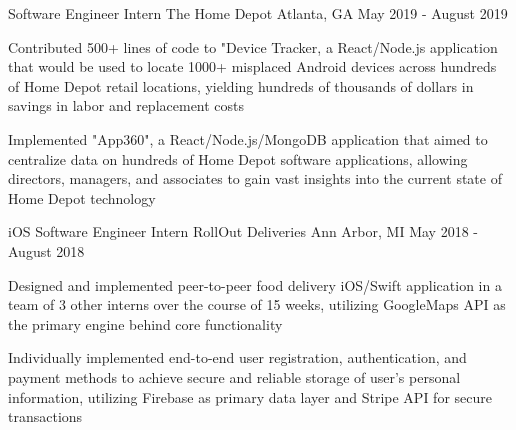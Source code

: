

\begin{cventries}

  \cventry
    {Software Engineer Intern} %
    {The Home Depot} %
    {Atlanta, GA} %
    {May 2019 - August 2019} %
    {
      \begin{cvitems} %
        \item {Contributed 500+ lines of code to "Device Tracker, a React/Node.js application that would be used to locate 1000+ misplaced Android devices across hundreds of Home Depot retail locations, yielding hundreds of thousands of dollars in savings in labor and replacement costs}
        \item {Implemented "App360", a React/Node.js/MongoDB application that aimed to centralize data on hundreds of Home Depot software applications, allowing directors, managers, and associates to gain vast insights into the current state of Home Depot technology}
      \end{cvitems}
    }

  \cventry
    {iOS Software Engineer Intern} %
    {RollOut Deliveries} %
    {Ann Arbor, MI} %
    {May 2018 - August 2018} %
    {
      \begin{cvitems} %
        \item {Designed and implemented peer-to-peer food delivery iOS/Swift application in a team of 3 other interns over the course of 15 weeks, utilizing GoogleMaps API as the primary engine behind core functionality}
        \item {Individually implemented end-to-end user registration, authentication, and payment methods to achieve secure and reliable storage of user's personal information, utilizing Firebase as primary data layer and Stripe API for secure transactions}
      \end{cvitems}
    }

\end{cventries}